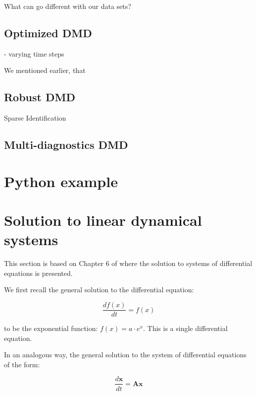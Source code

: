 \documentclass[10pt,twocolumn]{article}
\begin{document}
What can go different with our data sets?

\subsection{Optimized DMD}

- varying time steps

We mentioned earlier, that 

\subsection{Robust DMD}



Sparse Identification




\subsection{Multi-diagnostics DMD}

\section{Python example}



\appendix

\section{Solution to linear dynamical systems} \label{app:A}

This section is based on Chapter 6 of \cite{Prof_Gilbert_Strang} where the solution to systems of differential equations is presented.

We first recall the general solution to the differential equation:

\begin{equation} \label{eq:DE_exp}
\frac{d f(x)}{dt} = f(x)
\end{equation}

to be the exponential function: $f(x) = a \cdot e^{x}$. This is a single differential equation.


In an analogous way, the general solution to the system of differential equations of the form:

\begin{equation} \label{eq:system_linear_A}
\frac{d \mathbf{x}}{dt} = \mathbf{A} \mathbf{x}
\end{equation}
\end{document}
